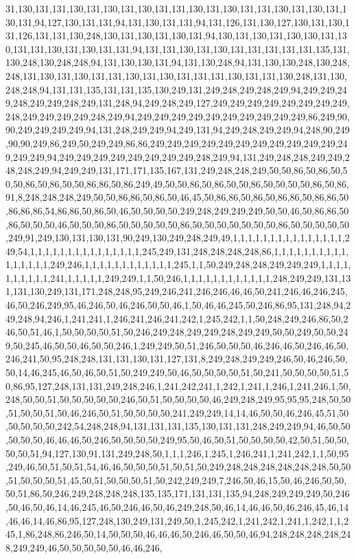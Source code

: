 31,130,131,131,130,131,130,131,130,131,131,130,131,130,131,131,130,131,130,131,130,131,94,127,130,131,131,94,131,130,131,131,94,131,126,131,130,127,130,131,130,131,126,131,131,130,248,130,131,130,131,130,131,94,130,131,130,131,130,130,131,130,131,131,130,131,130,131,131,94,131,131,130,131,130,131,131,131,131,131,135,131,130,248,130,248,248,94,131,130,130,131,94,131,130,248,94,131,130,130,248,130,248,248,131,130,131,130,131,131,130,131,130,131,131,131,130,131,131,130,248,131,130,248,248,94,131,131,135,131,131,135,130,249,131,249,248,249,248,249,94,249,249,249,248,249,249,248,249,131,248,94,249,248,249,127,249,249,249,249,249,249,249,249,248,249,249,249,249,248,249,94,249,249,249,249,249,249,249,249,249,249,86,249,90,90,249,249,249,249,94,131,248,249,249,94,249,131,94,249,248,249,249,94,248,90,249,90,90,249,86,249,50,249,249,86,86,249,249,249,249,249,249,249,249,249,249,249,249,249,249,94,249,249,249,249,249,249,249,249,248,249,94,131,249,248,248,249,249,248,248,249,94,249,249,131,171,171,135,167,131,249,248,248,249,50,50,86,50,86,50,50,50,86,50,86,50,50,86,86,50,86,249,49,50,50,86,50,86,50,50,86,50,50,50,50,86,50,86,91,8,248,248,248,249,50,50,86,86,50,86,50,46,45,50,86,86,50,86,50,86,86,50,86,86,50,86,86,86,54,86,86,50,86,50,46,50,50,50,50,249,248,249,249,249,50,50,46,50,86,86,50,86,50,50,50,46,50,50,50,86,50,50,50,50,50,86,50,50,50,50,50,50,50,86,50,50,50,50,50,249,91,249,130,131,130,131,90,249,130,249,248,249,49,1,1,1,1,1,1,1,1,1,1,1,1,1,1,1,249,54,1,1,1,1,1,1,1,1,1,1,1,1,1,1,1,245,249,131,248,248,248,248,86,1,1,1,1,1,1,1,1,1,1,1,1,1,1,1,1,249,246,1,1,1,1,1,1,1,1,1,1,1,1,245,1,1,50,249,248,248,249,249,249,1,1,1,1,1,1,1,1,1,1,241,1,1,1,1,1,249,249,1,1,50,246,1,1,1,1,1,1,1,1,1,1,1,1,248,249,249,131,131,131,130,249,131,171,248,248,95,249,246,241,246,246,46,46,50,241,246,46,246,245,46,50,246,249,95,46,246,50,46,246,50,50,46,1,50,46,46,245,50,246,86,95,131,248,94,249,248,94,246,1,241,241,1,246,241,246,241,242,1,245,242,1,1,50,248,249,246,86,50,246,50,51,46,1,50,50,50,50,51,50,246,249,248,249,249,248,249,249,50,50,249,50,50,249,50,245,46,50,50,46,50,50,246,1,249,249,50,51,246,50,50,50,46,246,46,50,246,46,50,246,241,50,95,248,248,131,131,130,131,127,131,8,249,248,249,249,246,50,46,246,50,50,14,46,245,46,50,46,50,51,50,249,249,50,46,50,50,50,50,51,50,241,50,50,50,50,51,50,86,95,127,248,131,131,249,248,246,1,241,242,241,1,242,1,241,1,246,1,241,246,1,50,248,50,50,51,50,50,50,50,50,246,50,51,50,50,50,50,46,249,248,249,95,95,95,248,50,50,51,50,50,51,50,46,246,50,51,50,50,50,50,241,249,249,14,14,46,50,50,46,246,45,51,50,50,50,50,50,242,54,248,248,94,131,131,131,135,130,131,131,248,249,249,94,46,50,50,50,50,50,46,46,46,50,246,50,50,50,50,249,95,50,46,50,51,50,50,50,50,42,50,51,50,50,50,50,51,94,127,130,91,131,249,248,50,1,1,1,246,1,245,1,246,241,1,241,242,1,1,50,95,249,46,50,51,50,51,54,46,46,50,50,50,51,50,51,50,249,248,248,248,248,248,248,50,50,51,50,50,50,51,45,50,51,50,50,50,51,50,242,249,249,7,246,50,46,15,50,46,246,50,50,50,51,86,50,246,249,248,248,248,135,135,171,131,131,135,94,248,249,249,249,50,246,50,46,50,46,14,46,245,46,50,246,46,50,46,249,248,50,46,14,46,46,50,46,246,45,46,14,46,46,14,46,86,95,127,248,130,249,131,249,50,1,245,242,1,241,242,1,241,1,242,1,1,245,1,86,248,86,246,50,14,50,50,50,46,46,46,50,246,46,50,50,46,94,248,248,248,248,248,249,249,46,50,50,50,50,50,46,46,246,